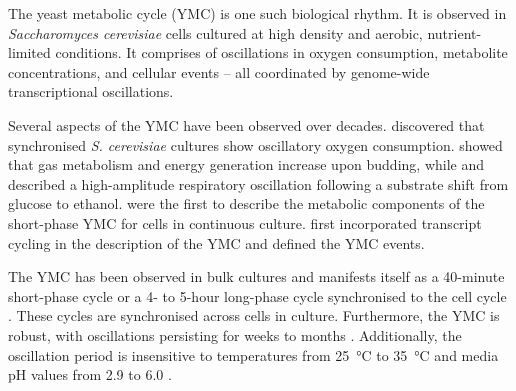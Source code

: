 
The yeast metabolic cycle (YMC) is one such biological rhythm.
It is observed in \emph{Saccharomyces cerevisiae} cells cultured at high density and aerobic,
nutrient-limited conditions.
It comprises of oscillations in oxygen consumption, metabolite concentrations, and cellular events -- all coordinated by genome-wide transcriptional oscillations.

Several aspects of the YMC have been observed over decades.
\citet{nosohSYNCHRONIZATIONBUDDINGCYCLE1962} discovered that synchronised \emph{S. cerevisiae} cultures show oscillatory oxygen consumption.
\citet{kasparvonmeyenburgEnergeticsBuddingCycle1969} showed that gas metabolism and energy generation increase upon budding, while and \citet{mochanRespiratoryOscillationsAdapting1973} described a high-amplitude respiratory oscillation following a substrate shift from glucose to ethanol.
\citet{satroutdinovOscillatoryMetabolismSaccharomyces1992} were the first to describe the metabolic components of the short-phase YMC for cells in continuous culture.
\citet{tuLogicYeastMetabolic2005} first incorporated transcript cycling in the description of the YMC and defined the YMC events.

The YMC has been observed in bulk cultures and manifests itself as a
40-minute short-phase cycle or
a 4- to 5-hour long-phase cycle synchronised to the cell cycle \citep{mellorMolecularBasisMetabolic2016}.
These cycles are synchronised across cells in culture.
Furthermore, the YMC is robust, with oscillations persisting for weeks to months \citep{lloydRedoxRhythmicityClocks2007}.
Additionally, the oscillation period is insensitive to temperatures from \SI{25}{\celsius} to \SI{35}{\celsius} and media pH values from
2.9 to 6.0 \citep{lloydUltradianMetronomeTimekeeper2005}.

